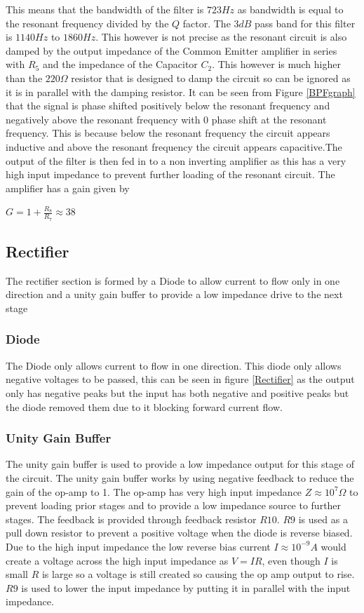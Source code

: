 \documentclass[10pt,a4paper]{article}
\begin{document}
   
This means that the bandwidth of the filter is $723Hz$ as bandwidth is equal to the resonant frequency divided by the $Q$ factor. The $3dB$ pass band for this filter is $1140Hz$ to $1860Hz$. This however is not precise as the resonant circuit is also damped by the output impedance of the Common Emitter amplifier in series with $R_5$ and the impedance of the Capacitor $C_2$. This however is much higher than the $220\Omega$ resistor that is designed to damp the circuit so can be ignored as it is in parallel with the damping resistor. It can be seen from Figure \ref{BPFgraph} that the signal is phase shifted positively below the resonant frequency and negatively above the resonant frequency with 0 phase shift     at the resonant frequency. This is because below the resonant frequency the circuit appears inductive and above the resonant frequency the circuit appears capacitive.The output of the filter is then fed in to a non inverting amplifier as this has a very high input impedance to prevent further loading of the resonant circuit. The amplifier has a gain given by
\begin{center}
\Huge

$G= 1+ \frac{R_8}{R_7}\approx 38$



\end{center}
\subsection{Rectifier}
The rectifier section is formed by a Diode to allow current to flow only in one direction and a unity gain buffer to provide a low impedance drive to the next stage
\subsubsection{Diode}
The Diode only allows current to flow in one direction. This diode only allows negative voltages to be passed, this can be seen in figure \ref{Rectifier} as the output only has negative peaks but the input has both negative and positive peaks but the diode removed them due to it blocking forward current flow.
\subsubsection{Unity Gain Buffer}
The unity gain buffer is used to provide a low impedance output for this stage of the circuit. The unity gain buffer works by using negative feedback to reduce the gain of the op-amp to 1. The op-amp has very high input impedance $Z \approx 10^7 \Omega$ to prevent loading prior stages and to provide a low impedance source to further stages. The feedback is provided through feedback resistor $R10$. $R9$ is used as a pull down resistor to prevent a positive voltage when the diode is reverse biased. Due to the high input impedance the low reverse bias current $I\approx 10^{-9}A$ would create a voltage across the high input impedance as $V=IR$, even though $I$ is small $R$ is large so a voltage is still created so causing the op amp output to rise. $R9$ is used to lower the input impedance by putting it in parallel with the input impedance.
\end{document}
